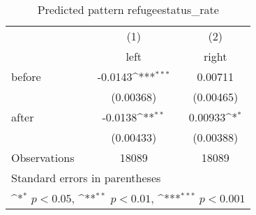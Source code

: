 \begin{table}[htbp]\centering
\def\sym#1{\ifmmode^{#1}\else\(^{#1}\)\fi}
\caption{Predicted pattern refugeestatus\_rate}
\begin{tabular}{l*{2}{c}}
\hline\hline
                    &\multicolumn{1}{c}{(1)}&\multicolumn{1}{c}{(2)}\\
                    &\multicolumn{1}{c}{left}&\multicolumn{1}{c}{right}\\
\hline
before              &     -0.0143\sym{***}&     0.00711         \\
                    &   (0.00368)         &   (0.00465)         \\
[1em]
after               &     -0.0138\sym{**} &     0.00933\sym{*}  \\
                    &   (0.00433)         &   (0.00388)         \\
\hline
Observations        &       18089         &       18089         \\
\hline\hline
\multicolumn{3}{l}{\footnotesize Standard errors in parentheses}\\
\multicolumn{3}{l}{\footnotesize \sym{*} \(p<0.05\), \sym{**} \(p<0.01\), \sym{***} \(p<0.001\)}\\
\end{tabular}
\end{table}
